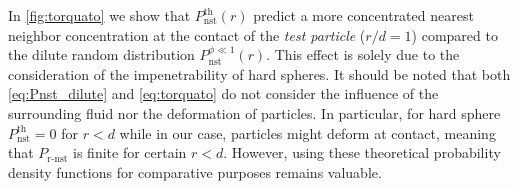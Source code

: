 In \ref{fig:torquato} we show that $P_\text{nst}^\text{th}(r)$ predict a more concentrated nearest neighbor concentration at the contact of the \textit{test particle} ($r/d=1$) compared to the dilute random distribution $P_\text{nst}^{\phi\ll 1}(r)$. 
This effect is solely due to the consideration of the impenetrability of hard spheres. 
It should be noted that both \ref{eq:Pnst_dilute} and \ref{eq:torquato} do not consider the influence of the surrounding fluid nor the deformation of particles. 
In particular, for hard sphere $P_\text{nst}^\text{th} = 0$ for $r<d$ while in our case, particles might deform at contact, meaning that $P_\text{r-nst}$ is finite for certain $r<d$. 
However, using these theoretical probability density functions for comparative purposes remains valuable. 


